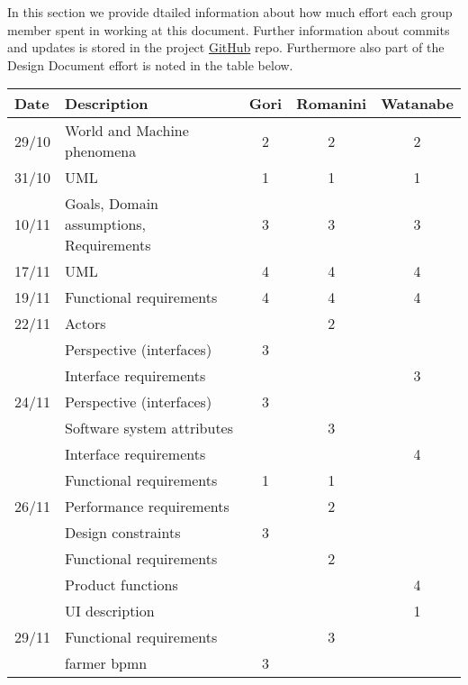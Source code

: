 In this section we provide dtailed information about how much effort each group member spent in working at this document. Further information about commits and updates is stored in the project \href{https://github.com/MarcoRomanini/GoriRomaniniWatanabe}{GitHub} repo. Furthermore also part of the Design Document effort is noted in the table below. 


\begin{center}
    \setlength\arrayrulewidth{1pt}
    \begin{longtable}{llccc}
        
        \hline
        \rowcolor{myblue}\color{white}Date & \color{white}Description & \color{white}Gori & \color{white}Romanini & \color{white}Watanabe \\
        \hline
        29/10	&	World and Machine phenomena	&	2	&	2	&	2	\\
        \hline
        31/10	&	UML	&	1	&	1	&	1	\\
        \hline
        10/11	&	Goals, Domain assumptions, Requirements	&	3	&	3	&	3	\\
        \hline
        17/11	&	UML	&	4	&	4	&	4	\\
        \hline
        19/11	&	Functional requirements	&	4	&	4	&	4	\\
        \hline
        22/11	&	Actors	&		&	2	&		\\
        	&	Perspective (interfaces)	&	3	&		&		\\
        	&	Interface requirements	&		&		&	3	\\
        \hline
        24/11	&	Perspective (interfaces)	&	3	&		&		\\
        	&	Software system attributes	&		&	3	&		\\
        	&	Interface requirements	&		&		&	4	\\
        	&	Functional requirements	&	1	&	1	&		\\
        \hline
        26/11	&	Performance requirements	&		&	2	&		\\
        	&	Design constraints	&	3	&		&		\\
        	&	Functional requirements	&		&	2	&		\\
        	&	Product functions	&		&		&	4	\\
        	&	UI description	&		&		&	1	\\
        \hline
        29/11	&	Functional requirements	&		&	3	&		\\
        	&	farmer bpmn	&	3	&		&		\\

\end{longtable}
\end{center}
